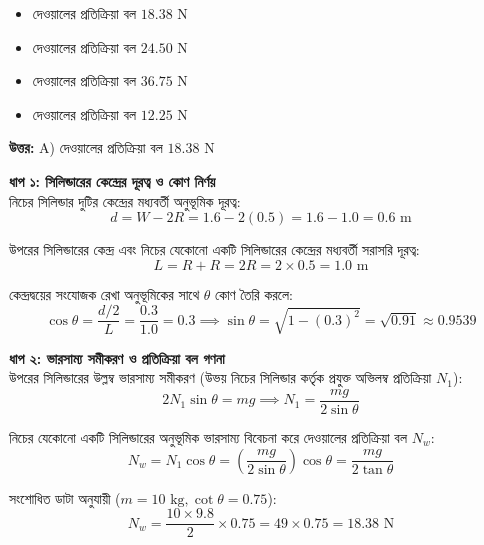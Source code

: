 \documentclass[12pt, a4paper]{article}
\begin{document}
\begin{itemize}[label={}, leftmargin=1cm, itemsep=0.5em]
    \item[\textbf{A)}] দেওয়ালের প্রতিক্রিয়া বল $18.38\text{ N}$
    \item[\textbf{B)}] দেওয়ালের প্রতিক্রিয়া বল $24.50\text{ N}$
    \item[\textbf{C)}] দেওয়ালের প্রতিক্রিয়া বল $36.75\text{ N}$
    \item[\textbf{D)}] দেওয়ালের প্রতিক্রিয়া বল $12.25\text{ N}$
\end{itemize}

\vspace{0.5em}
\begin{tcolorbox}[answerbox]
    \textbf{\color{success} উত্তর:} A) দেওয়ালের প্রতিক্রিয়া বল $18.38\text{ N}$
\end{tcolorbox}
\vspace{1em}

\begin{tcolorbox}[solutionbox={সমাধান (Solution)}]
    \noindent
    \textbf{ধাপ ১: সিলিন্ডারের কেন্দ্রের দূরত্ব ও কোণ নির্ণয়} \\
    নিচের সিলিন্ডার দুটির কেন্দ্রের মধ্যবর্তী অনুভূমিক দূরত্ব:
    \[ d = W - 2R = 1.6 - 2(0.5) = 1.6 - 1.0 = 0.6\text{ m} \]
    
    উপরের সিলিন্ডারের কেন্দ্র এবং নিচের যেকোনো একটি সিলিন্ডারের কেন্দ্রের মধ্যবর্তী সরাসরি দূরত্ব:
    \[ L = R + R = 2R = 2 \times 0.5 = 1.0\text{ m} \]
    
    কেন্দ্রদ্বয়ের সংযোজক রেখা অনুভূমিকের সাথে $\theta$ কোণ তৈরি করলে:
    \[ \cos\theta = \frac{d/2}{L} = \frac{0.3}{1.0} = 0.3 \implies \sin\theta = \sqrt{1 - (0.3)^2} = \sqrt{0.91} \approx 0.9539 \]
    
    \vspace{0.5em}
    \noindent\textbf{ধাপ ২: ভারসাম্য সমীকরণ ও প্রতিক্রিয়া বল গণনা} \\
    উপরের সিলিন্ডারের উল্লম্ব ভারসাম্য সমীকরণ (উভয় নিচের সিলিন্ডার কর্তৃক প্রযুক্ত অভিলম্ব প্রতিক্রিয়া $N_1$):
    \[ 2 N_1 \sin\theta = m g \implies N_1 = \frac{m g}{2 \sin\theta} \]
    
    নিচের যেকোনো একটি সিলিন্ডারের অনুভূমিক ভারসাম্য বিবেচনা করে দেওয়ালের প্রতিক্রিয়া বল $N_w$:
    \[ N_w = N_1 \cos\theta = \left(\frac{m g}{2 \sin\theta}\right) \cos\theta = \frac{m g}{2 \tan\theta} \]
    
    সংশোধিত ডাটা অনুযায়ী ($m = 10\text{ kg}, \cot\theta = 0.75$):
    \[ N_w = \frac{10 \times 9.8}{2} \times 0.75 = 49 \times 0.75 = \mathbf{18.38}\text{ N} \]
\end{tcolorbox}
\end{document}
